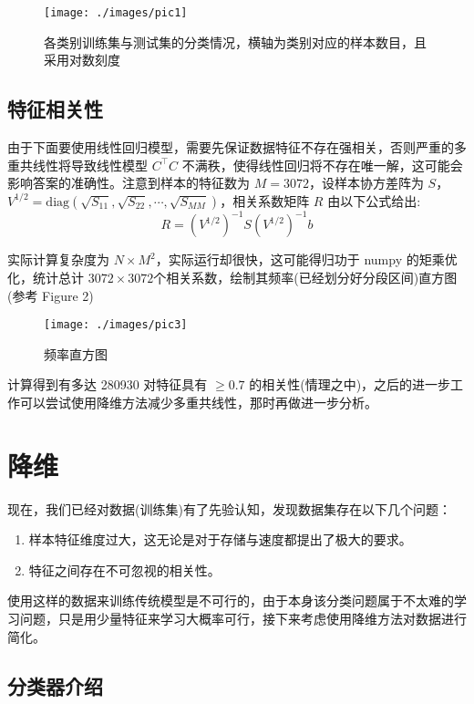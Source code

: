 \documentclass[fleqn]{Paquetes/RevDigMatEduInt}
\begin{document}
\begin{figure}[h]
	\centering
	\texttt{[image: ./images/pic1]}
	\caption{各类别训练集与测试集的分类情况，横轴为类别对应的样本数目，且采用对数刻度}
\end{figure}



\subsection{特征相关性}

由于下面要使用线性回归模型，需要先保证数据特征不存在强相关，否则严重的多重共线性将导致线性模型 $C^\top C$ 不满秩，使得线性回归将不存在唯一解，这可能会影响答案的准确性。注意到样本的特征数为 $M = 3072$，设样本协方差阵为 $S$，$V^{1/2} = \mathrm{diag}(\sqrt{S_{11}},  \sqrt{S_{22}},\cdots,\sqrt{S_{MM}})$，相关系数矩阵  $R$ 由以下公式给出:
$$
R = (V^{1/2})^{-1}S(V^{1/2})^{-1}b 
$$

实际计算复杂度为 $N \times M^2$，实际运行却很快，这可能得归功于 numpy 的矩乘优化，统计总计 $3072 \times 3072$个相关系数，绘制其频率(已经划分好分段区间)直方图(参考 Figure 2)

\begin{figure}[h]
	\centering
	\texttt{[image: ./images/pic3]}
	\caption{频率直方图}
\end{figure}

计算得到有多达 280930 对特征具有 $\geq 0.7$ 的相关性(情理之中)，之后的进一步工作可以尝试使用降维方法减少多重共线性，那时再做进一步分析。


\section{降维}
现在，我们已经对数据(训练集)有了先验认知，发现数据集存在以下几个问题：
\begin{observacion}
\begin{enumerate}
	\item 样本特征维度过大，这无论是对于存储与速度都提出了极大的要求。
	\item 特征之间存在不可忽视的相关性。
\end{enumerate}
\end{observacion}
使用这样的数据来训练传统模型是不可行的，由于本身该分类问题属于不太难的学习问题，只是用少量特征来学习大概率可行，接下来考虑使用降维方法对数据进行简化。


\subsection{分类器介绍}
\end{document}
